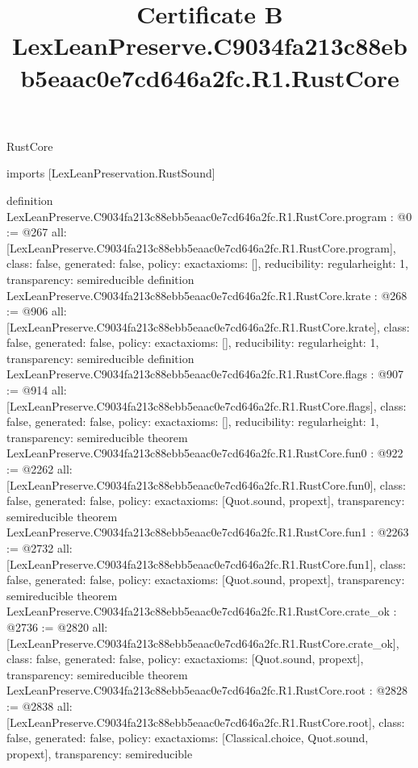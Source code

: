 \begin{lexlean}{RustCore}
\title{Certificate B LexLeanPreserve.C9034fa213c88ebb5eaac0e7cd646a2fc.R1.RustCore}
\begin{coremodule}
imports [LexLeanPreservation.RustSound]

definition LexLeanPreserve.C9034fa213c88ebb5eaac0e7cd646a2fc.R1.RustCore.program : @0 := @267 {
  all: [LexLeanPreserve.C9034fa213c88ebb5eaac0e7cd646a2fc.R1.RustCore.program],
  class: false,
  generated: false,
  policy: exact{axioms: []},
  reducibility: regular{height: 1},
  transparency: semireducible
}
definition LexLeanPreserve.C9034fa213c88ebb5eaac0e7cd646a2fc.R1.RustCore.krate : @268 := @906 {
  all: [LexLeanPreserve.C9034fa213c88ebb5eaac0e7cd646a2fc.R1.RustCore.krate],
  class: false,
  generated: false,
  policy: exact{axioms: []},
  reducibility: regular{height: 1},
  transparency: semireducible
}
definition LexLeanPreserve.C9034fa213c88ebb5eaac0e7cd646a2fc.R1.RustCore.flags : @907 := @914 {
  all: [LexLeanPreserve.C9034fa213c88ebb5eaac0e7cd646a2fc.R1.RustCore.flags],
  class: false,
  generated: false,
  policy: exact{axioms: []},
  reducibility: regular{height: 1},
  transparency: semireducible
}
theorem LexLeanPreserve.C9034fa213c88ebb5eaac0e7cd646a2fc.R1.RustCore.fun0 : @922 := @2262 {
  all: [LexLeanPreserve.C9034fa213c88ebb5eaac0e7cd646a2fc.R1.RustCore.fun0],
  class: false,
  generated: false,
  policy: exact{axioms: [Quot.sound, propext]},
  transparency: semireducible
}
theorem LexLeanPreserve.C9034fa213c88ebb5eaac0e7cd646a2fc.R1.RustCore.fun1 : @2263 := @2732 {
  all: [LexLeanPreserve.C9034fa213c88ebb5eaac0e7cd646a2fc.R1.RustCore.fun1],
  class: false,
  generated: false,
  policy: exact{axioms: [Quot.sound, propext]},
  transparency: semireducible
}
theorem LexLeanPreserve.C9034fa213c88ebb5eaac0e7cd646a2fc.R1.RustCore.crate_ok : @2736 := @2820 {
  all: [LexLeanPreserve.C9034fa213c88ebb5eaac0e7cd646a2fc.R1.RustCore.crate_ok],
  class: false,
  generated: false,
  policy: exact{axioms: [Quot.sound, propext]},
  transparency: semireducible
}
theorem LexLeanPreserve.C9034fa213c88ebb5eaac0e7cd646a2fc.R1.RustCore.root : @2828 := @2838 {
  all: [LexLeanPreserve.C9034fa213c88ebb5eaac0e7cd646a2fc.R1.RustCore.root],
  class: false,
  generated: false,
  policy: exact{axioms: [Classical.choice, Quot.sound, propext]},
  transparency: semireducible
}


\end{coremodule}
\end{lexlean}
